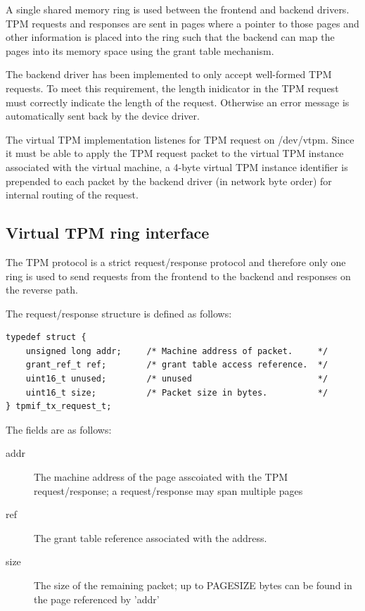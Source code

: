\documentclass[11pt,twoside,final,openright]{report}
\begin{document}
A single shared memory ring is used between the frontend and backend
drivers. TPM requests and responses are sent in pages where a pointer
to those pages and other information is placed into the ring such that
the backend can map the pages into its memory space using the grant
table mechanism.

The backend driver has been implemented to only accept well-formed
TPM requests. To meet this requirement, the length inidicator in the
TPM request must correctly indicate the length of the request.
Otherwise an error message is automatically sent back by the device driver.

The virtual TPM implementation listenes for TPM request on /dev/vtpm. Since
it must be able to apply the TPM request packet to the virtual TPM instance
associated with the virtual machine, a 4-byte virtual TPM instance
identifier is prepended to each packet by the backend driver (in network
byte order) for internal routing of the request.

\subsection{Virtual TPM ring interface}

The TPM protocol is a strict request/response protocol and therefore
only one ring is used to send requests from the frontend to the backend
and responses on the reverse path.

The request/response structure is defined as follows:

\scriptsize
\begin{verbatim}
typedef struct {
    unsigned long addr;     /* Machine address of packet.     */
    grant_ref_t ref;        /* grant table access reference.  */
    uint16_t unused;        /* unused                         */
    uint16_t size;          /* Packet size in bytes.          */
} tpmif_tx_request_t;
\end{verbatim}
\normalsize

The fields are as follows:

\begin{description}
\item[addr] The machine address of the page asscoiated with the TPM
            request/response; a request/response may span multiple
            pages
\item[ref]  The grant table reference associated with the address.
\item[size] The size of the remaining packet; up to
            PAGE{\textunderscore}SIZE bytes can be found in the
            page referenced by 'addr'
\end{description}
\end{document}

